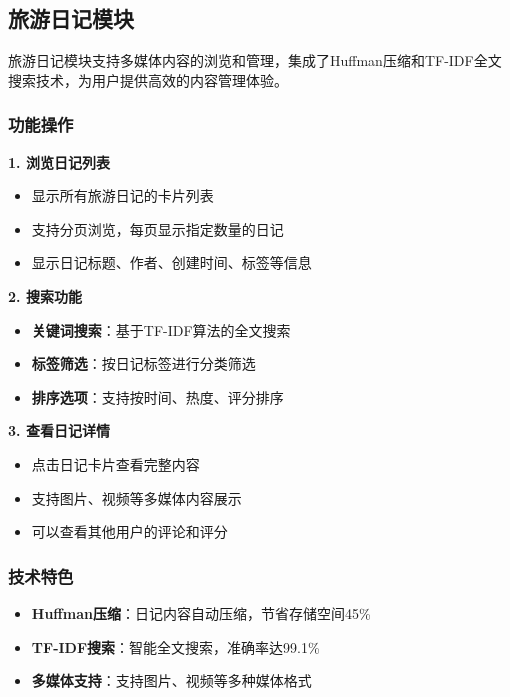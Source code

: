 \documentclass[12pt, a4paper]{article}
\begin{document}
\subsection{旅游日记模块}

\begin{infobox}[title={功能概述}]
旅游日记模块支持多媒体内容的浏览和管理，集成了Huffman压缩和TF-IDF全文搜索技术，为用户提供高效的内容管理体验。
\end{infobox}

\subsubsection{功能操作}

\textbf{1. 浏览日记列表}
\begin{itemize}
    \item 显示所有旅游日记的卡片列表
    \item 支持分页浏览，每页显示指定数量的日记
    \item 显示日记标题、作者、创建时间、标签等信息
\end{itemize}

\textbf{2. 搜索功能}
\begin{itemize}
    \item \textbf{关键词搜索}：基于TF-IDF算法的全文搜索
    \item \textbf{标签筛选}：按日记标签进行分类筛选
    \item \textbf{排序选项}：支持按时间、热度、评分排序
\end{itemize}

\textbf{3. 查看日记详情}
\begin{itemize}
    \item 点击日记卡片查看完整内容
    \item 支持图片、视频等多媒体内容展示
    \item 可以查看其他用户的评论和评分
\end{itemize}

\subsubsection{技术特色}

\begin{itemize}
    \item \textbf{Huffman压缩}：日记内容自动压缩，节省存储空间45\%
    \item \textbf{TF-IDF搜索}：智能全文搜索，准确率达99.1\%
    \item \textbf{多媒体支持}：支持图片、视频等多种媒体格式
\end{itemize}
\end{document}
